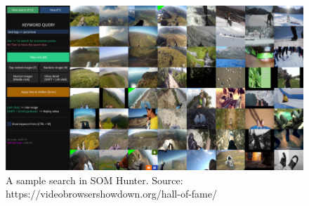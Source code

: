 \begin{figure}
    \centering
    \includegraphics[width=0.99\linewidth]{img/som_hunter_small.png}
    \caption{A sample search in SOM Hunter. Source: https://videobrowsershowdown.org/hall-of-fame/}
    \label{fig:som_hunter}
\end{figure}

